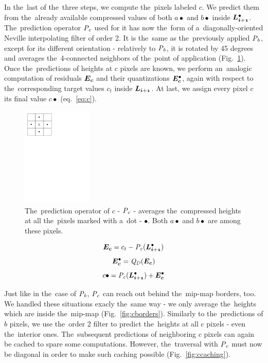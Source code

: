 In the~last of the~three steps, we compute the~pixels labeled $c$. We predict them from the~already available compressed values of both $a\bullet$ and $b\bullet$ inside $\ldot{i+1}$. The~prediction operator $\mathit{P_{c}}$ used for it has now the~form of a~diagonally-oriented Neville interpolating filter of order 2. It is the~same as the~previously applied $\mathit{P_{b}}$, except for its different orientation - relatively to $\mathit{P_{b}}$, it is rotated by 45 degrees and averages the~4-connected neighbors of the~point of application (Fig.~\ref{fig:ccomp}). Once the~predictions of heights at $c$ pixels are known, we perform an~analogic computation of residuals $\objnorm{E}{c}$ and their quantizations $\objdot{E}{c}$, again with respect to the~corresponding target values $c_t$ inside $\lnorm{i+1}$. At last, we assign every pixel $c$ its final value $c\bullet$ (eq.~\ref{eq:c}).

\begin{figure}
	\includegraphics[trim={0 21cm 10cm 0}, clip, width=0.3\textwidth]{figures/ccomp.pdf}\centering
	\caption{The~prediction operator of $c$ - $\mathit{P_{c}}$ - averages the~compressed heights at all the~pixels marked with a~dot - $\bullet$. Both $a\bullet$ and $b\bullet$ are among these pixels.}
	\label{fig:ccomp}
\end{figure}

$$\objnorm{E}{c} = c_t - \opnorm{P}{c}(\ldot{i+1})$$
$$\objdot{E}{c} = \opnorm{Q}{D}(\objnorm{E}{c})$$
\begin{equation}
\label{eq:c}
c\bullet = \opnorm{P}{c}(\ldot{i+1}) + \objdot{E}{c}
\end{equation}

Just like in the~case of $\mathit{P_{b}}$, $\mathit{P_{c}}$ can reach out behind the~mip-map borders, too. We handled these situations exacly the~same way - we only average the~heights which are inside the~mip-map (Fig.~\ref{fig:cborders}). Similarly to the~predictions of $b$ pixels, we use the~order 2 filter to predict the~heights at all $c$ pixels - even the~interior ones. The~subsequent predictions of neighboring $c$ pixels can again be cached to spare some computations. However, the~traversal with $\mathit{P_{c}}$ must now be diagonal in order to make such caching possible (Fig.~\ref{fig:ccaching}).

